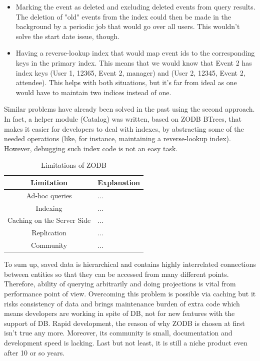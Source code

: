 \begin{itemize}
  \item Marking the event as deleted and excluding deleted events from query results. The deletion of "old" events from the index could then be made in the background by a periodic job that would go over all users. This wouldn't solve the start date issue, though.
  \item Having a reverse-lookup index that would map event ids to the corresponding keys in the primary index. This means that we would know that Event 2 has index keys (User 1, 12365, Event 2, manager) and (User 2, 12345, Event 2, attendee). This helps with both situations, but it's far from ideal as one would have to maintain two indices instead of one.
\end{itemize}

Similar problems have already been solved in the past using the second approach. In fact, a helper module (Catalog) was written, based on ZODB BTrees, that makes it easier for developers to deal with indexes, by abstracting some of the needed operations (like, for instance, maintaining a reverse-lookup index). However, debugging such index code is not an easy task.

\begin{table}[t]
	\centering
    \begin{tabular}{ | c | l |}
    \hline
    \textbf{Limitation} & \textbf{Explanation} \\ \hline
    Ad-hoc queries & ... \\ \hline
    Indexing & ... \\ \hline
    Caching on the Server Side & ... \\ \hline
    Replication & ... \\ \hline
    Community & ... \\ \hline
    \end{tabular}
    \caption{Limitations of ZODB}
    \label{limitations}
\end{table}

To sum up, saved data is hierarchical and contains highly interrelated connections between entities so that they can be accessed from many different points. Therefore, ability of querying arbitrarily and doing projections is vital from performance point of view. Overcoming this problem is possible via caching but it risks consistency of data and brings maintenance burden of extra code which means developers are working in spite of DB, not for new features with the support of DB. Rapid development, the reason of why ZODB is chosen at first isn't true any more. Moreover, its community is small, documentation and development speed is lacking. Last but not least, it is still a niche product even after 10 or so years.


